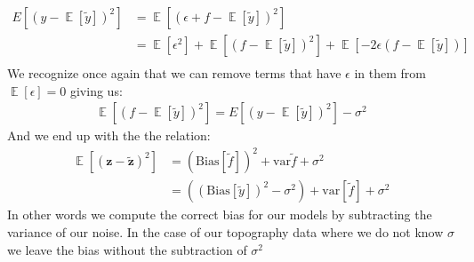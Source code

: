 \documentclass[12pt]{article}
\DeclareMathOperator*{\E}{\mathbb{E}}
\begin{document}
\begin{align*}
  E[(y - \E[\tilde{y}])^2] &= \E[(\epsilon + f - \E[\tilde{y}])^2] \\
                           &= \E[\epsilon^2] + \E[(f- \E[\tilde{y}])^2] + \E[-2\epsilon(f- \E[\tilde{y}])] \\
\end{align*}
We recognize once again that we can remove terms that have $\epsilon$ in them from $\E[\epsilon] = 0$ giving us:
\begin{align*}
  \E[(f- \E[\tilde{y}])^2] =   E[(y - \E[\tilde{y}])^2] - \sigma^2
\end{align*}
And we end up with the the relation:
\begin{align*}
  \E[(\boldsymbol{z}- \boldsymbol{\tilde{z}})^2] &= (\text{Bias}[\tilde{f}])^2 + \text{var}{\tilde{f}} + \sigma^2\\
   &=   \left((\text{Bias}[\tilde{y}])^2 - \sigma^2\right) + \text{var}[\tilde{f}] + \sigma^2
\end{align*}
In other words we compute the correct bias for our models by subtracting the variance of our noise. In the case of our topography data where we do not know $\sigma$ we leave the bias without the subtraction of $\sigma^2$
\end{document}

